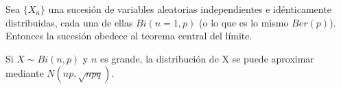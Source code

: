 \begin{teo}
    Sea $\{X_n\}$ una sucesión de variables aleatorias independientes e idénticamente distribuidas, cada una de ellas $Bi(n = 1, p)$ (o lo que es lo mismo $Ber(p)$). Entonces la sucesión obedece al teorema central del límite.
\end{teo}

\begin{cor}
    Si $X \sim Bi(n,p)$ y $n$ es grande, la distribución de X se puede aproximar mediante $N(np, \sqrt{npq})$.
\end{cor}

